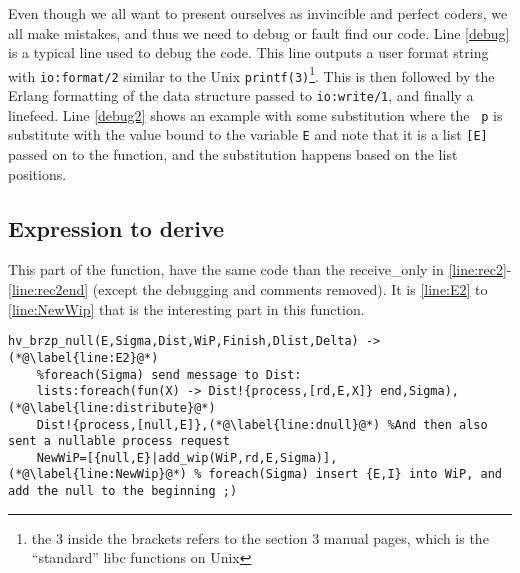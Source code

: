 Even though we all want to present ourselves as invincible and perfect
coders, we all make mistakes, and thus we need to debug or fault find
our code. Line \autoref{debug} is a typical line used to debug the
code. This line outputs a user format string with \texttt{io:format/2} similar to the Unix
\texttt{printf(3)}\footnote{the 3 inside the brackets refers to the
  section 3 manual pages, which is the ``standard'' libc functions
  on Unix}. This is  then followed by the Erlang formatting of the
data structure passed to \texttt{io:write/1}, and finally a
linefeed. Line \autoref{debug2} shows an example with some substitution
where the \texttt{~p} is substitute with the value bound to the
variable \texttt{E} and note that it is a list \texttt{[E]} passed on
to the function, and the substitution happens based on the list positions.


\subsection{Expression to derive}
\label{sec:expr-derive}

This part of the function, have the same code than the receive\_only in
\autoref{line:rec2}-\ref{line:rec2end} (except the debugging and
comments removed). It is 
\autoref{line:E2} to \autoref{line:NewWip} that is the interesting part in this
function.

\begin{lstlisting}[name=hvp2]
% When we have an RE/E d/di that needs to be derived/etc.
hv_brzp_null(E,Sigma,Dist,WiP,Finish,Dlist,Delta) ->(*@\label{line:E2}@*)
	%foreach(Sigma) send message to Dist:
	lists:foreach(fun(X) -> Dist!{process,[rd,E,X]} end,Sigma),(*@\label{line:distribute}@*)
	Dist!{process,[null,E]},(*@\label{line:dnull}@*) %And then also sent a nullable process request
	NewWiP=[{null,E}|add_wip(WiP,rd,E,Sigma)],(*@\label{line:NewWip}@*) % foreach(Sigma) insert {E,I} into WiP, and add the null to the beginning ;)
\end{lstlisting}

